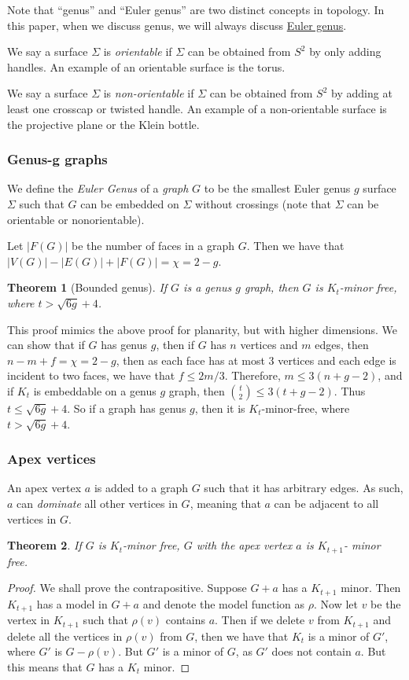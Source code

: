\documentclass[]{report}
\newtheorem{theorem}{Theorem}
\theoremstyle{definition}
\numberwithin{theorem}{section}
\numberwithin{equation}{section}
\begin{document}
Note that ``genus'' and ``Euler genus'' are two distinct concepts in topology. In this paper, when we discuss genus, we will always discuss \underline{Euler genus}.

We say a surface $\Sigma$ is \textit{orientable} if $\Sigma$ can be obtained from $S^2$ by only adding handles. An example of an orientable surface is the torus.

We say a surface $\Sigma$ is \textit{non-orientable} if $\Sigma$ can be obtained from $S^2$ by adding at least one crosscap or twisted handle. An example of a non-orientable surface is the projective plane or the Klein bottle. 

\subsubsection{Genus-g graphs}\label{sssec:Graph_genus}

We define the \textit{Euler Genus} of a \textit{graph} $G$ to be the smallest Euler genus $g$ surface $\Sigma$ such that $G$ can be embedded on $\Sigma$ without crossings (note that $\Sigma$ can be orientable or nonorientable).

Let $|F(G)|$ be the number of faces in a graph $G$. Then we have that $|V(G)| - |E(G)| + |F(G)| = \chi = 2 - g$. 

\begin{theorem}[Bounded genus]\label{thm:bounded_genus_kt_free}
	If $G$ is a genus $g$ graph, then $G$ is $K_t$-minor free, where $t > \sqrt{6g} + 4$. 
\end{theorem}
This proof mimics the above proof for planarity, but with higher dimensions. 
We can show that if $G$ has genus $g$, then if $G$ has $n$ vertices and $m$ edges, then $n - m + f = \chi = 2-g$, then as each face has at most 3 vertices and each edge is incident to two faces, we have that $f \leq 2m/3$. Therefore, $m \leq 3(n + g - 2)$, and if $K_t$ is embeddable on a genus $g$ graph, then $\binom{t}{2} \leq 3 (t + g - 2)$. Thus $t \leq \sqrt{6g} + 4$. So if a graph has genus $g$, then it is $K_t$-minor-free, where $t > \sqrt{6g} + 4$. 

\subsubsection{Apex vertices}\label{sssec:Apex_Vertices}
An apex vertex $a$ is added to a graph $G$ such that it has arbitrary edges. As such, $a$ can \textit{dominate} all other vertices in $G$, meaning that $a$ can be adjacent to all vertices in $G$. 
\begin{theorem}
	If $G$ is $K_t$-minor free, $G$ with the apex vertex $a$ is $K_{t+1}$- minor free. 
\end{theorem}
\begin{proof}
	We shall prove the contrapositive. Suppose $G + a$ has a $K_{t + 1}$ minor. Then $K_{t + 1}$ has a model in $G + a$ and denote the model function as $\rho$. Now let $v$ be the vertex in $K_{t + 1}$ such that $\rho(v)$ contains $a$. Then if we delete $v$ from $K_{t + 1}$ and delete all the vertices in $\rho(v)$ from $G$, then we have that $K_t$ is a minor of $G'$, where $G'$ is $G - \rho(v)$. But $G'$ is a minor of $G$, as $G'$ does not contain $a$. But this means that $G$ has a $K_t$ minor. 
\end{proof}
\end{document}
